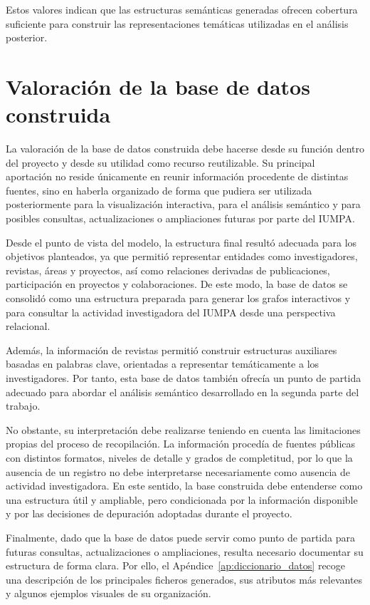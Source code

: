 \documentclass[11pt,spanish,listoffigures,listoftables]{tfgetsinf}
\begin{document}
Estos valores indican que las estructuras semánticas generadas ofrecen cobertura suficiente para construir las representaciones temáticas utilizadas en el análisis posterior.

\section{Valoración de la base de datos construida}

La valoración de la base de datos construida debe hacerse desde su función dentro del proyecto y desde su utilidad como recurso reutilizable. Su principal aportación no reside únicamente en reunir información procedente de distintas fuentes, sino en haberla organizado de forma que pudiera ser utilizada posteriormente para la visualización interactiva, para el análisis semántico y para posibles consultas, actualizaciones o ampliaciones futuras por parte del IUMPA.

Desde el punto de vista del modelo, la estructura final resultó adecuada para los objetivos planteados, ya que permitió representar entidades como investigadores, revistas, áreas y proyectos, así como relaciones derivadas de publicaciones, participación en proyectos y colaboraciones. De este modo, la base de datos se consolidó como una estructura preparada para generar los grafos interactivos y para consultar la actividad investigadora del IUMPA desde una perspectiva relacional.

Además, la información de revistas permitió construir estructuras auxiliares basadas en palabras clave, orientadas a representar temáticamente a los investigadores. Por tanto, esta base de datos también ofrecía un punto de partida adecuado para abordar el análisis semántico desarrollado en la segunda parte del trabajo.

No obstante, su interpretación debe realizarse teniendo en cuenta las limitaciones propias del proceso de recopilación. La información procedía de fuentes públicas con distintos formatos, niveles de detalle y grados de completitud, por lo que la ausencia de un registro no debe interpretarse necesariamente como ausencia de actividad investigadora. En este sentido, la base construida debe entenderse como una estructura útil y ampliable, pero condicionada por la información disponible y por las decisiones de depuración adoptadas durante el proyecto.

Finalmente, dado que la base de datos puede servir como punto de partida para futuras consultas, actualizaciones o ampliaciones, resulta necesario documentar su estructura de forma clara. Por ello, el Apéndice~\ref{ap:diccionario_datos} recoge una descripción de los principales ficheros generados, sus atributos más relevantes y algunos ejemplos visuales de su organización.
\end{document}
